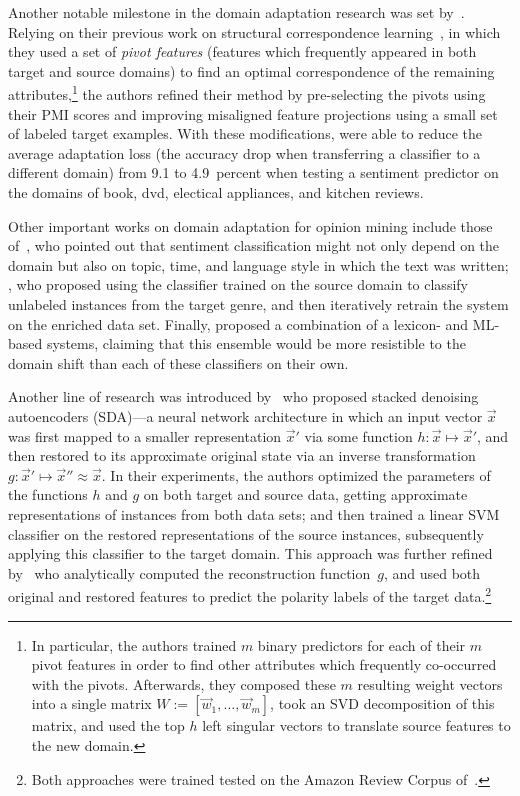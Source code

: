 Another notable milestone in the domain adaptation research was set
by~\citet{Blitzer:07}.  Relying on their previous work on structural
correspondence learning~\cite{Blitzer:07}, in which they used a set of
\emph{pivot features} (features which frequently appeared in both
target and source domains) to find an optimal correspondence of the
remaining attributes,\footnote{In particular, the authors trained $m$
  binary predictors for each of their $m$ pivot features in order to
  find other attributes which frequently co-occurred with the pivots.
  Afterwards, they composed these $m$ resulting weight vectors into a
  single matrix $W := [\vec{w}_{1},\ldots,\vec{w}_{m}]$, took an SVD
  decomposition of this matrix, and used the top $h$ left singular
  vectors to translate source features to the new domain.} the authors
refined their method by pre-selecting the pivots using their PMI
scores and improving misaligned feature projections using a small set
of labeled target examples.  With these modifications,
\citeauthor{Blitzer:07} were able to reduce the average adaptation
loss (the accuracy drop when transferring a classifier to a different
domain) from 9.1 to 4.9~percent when testing a sentiment predictor on
the domains of book, dvd, electical appliances, and kitchen reviews.

Other important works on domain adaptation for opinion mining include
those of~\citet{Read:05}, who pointed out that sentiment
classification might not only depend on the domain but also on topic,
time, and language style in which the text was written;
\citet{Tan:07}, who proposed using the classifier trained on the
source domain to classify unlabeled instances from the target genre,
and then iteratively retrain the system on the enriched data set.
Finally, \citet{Andreevskaia:08} proposed a combination of a lexicon-
and ML-based systems, claiming that this ensemble would be more
resistible to the domain shift than each of these classifiers on their
own.

Another line of research was introduced by~\citet{Glorot:11} who
proposed stacked denoising autoencoders (SDA)---a neural network
architecture in which an input vector $\vec{x}$ was first mapped to a
smaller representation $\vec{x}'$ via some function
$h: \vec{x}\mapsto\vec{x}'$, and then restored to its approximate
original state via an inverse transformation
$g: \vec{x}'\mapsto\vec{x}''\approx\vec{x}$.  In their experiments,
the authors optimized the parameters of the functions $h$ and $g$ on
both target and source data, getting approximate representations of
instances from both data sets; and then trained a linear SVM
classifier on the restored representations of the source instances,
subsequently applying this classifier to the target domain.  This
approach was further refined by~\citet{Chen:12} who analytically
computed the reconstruction function~$g$, and used both original and
restored features to predict the polarity labels of the target
data.\footnote{Both approaches were trained tested on the Amazon
  Review Corpus of~\citet{Blitzer:07}.}


